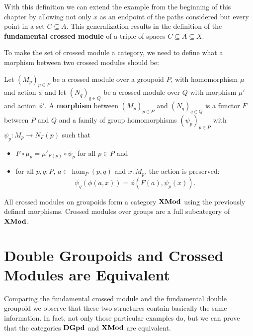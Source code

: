 With this definition we can extend the example from the beginning of this
chapter by allowing not only $x$ as an endpoint of the paths considered but every
point in a set $C \subseteq A$.
This generalization results in the definition of the \textbf{fundamental crossed
module} of a triple of spaces $C \subseteq A \subseteq X$.

To make the set of crossed module a category, we need to define what a morphism
between two crossed modules should be:

\begin{defn}
Let $(M_p)_{p \in P}$ be a crossed module over a groupoid $P$, with homomorphism
$\mu$ and action $\phi$ and let $(N_q)_{q \in Q}$ be a crossed module over $Q$
with morphism $\mu'$ and action $\phi'$.
A \textbf{morphism} between $(M_p)_{p \in P}$ and $(N_q)_{q \in Q}$ is a functor $F$
between $P$ and $Q$ and a family of group homomorphisms $(\psi_p)_{p \in P}$ 
with $\psi_p : M_p \to N_F(p)$ such that %
\begin{itemize}
\item $F \circ \mu_p = \mu'_{F(p)} \circ \psi_p$ for all $p \in P$ and
\item for all $p, q : P$, $a \in \hom_P(p,q)$ and $x : M_p$, the action is preserved:
\begin{equation*}
\psi_q(\phi(a,x)) = \phi(F(a),\psi_p(x)) \text{.} %
\end{equation*}
\end{itemize}
\end{defn}

\begin{defn}
All crossed modules on groupoids form a category $\mathbf{XMod}$ using the previously
defined morphisms. Crossed modules over groups are a full subcategory of $\mathbf{XMod}$.
\end{defn}

\section[DGpd and XMod are Equivalent]{Double Groupoids and Crossed Modules are Equivalent}

Comparing the fundamental crossed module and the fundamental double groupoid we
observe that these two structures contain basically the same information.
In fact, not only those particular examples do, but we can prove that the categories
$\mathbf{DGpd}$ and $\mathbf{XMod}$ are equivalent.

